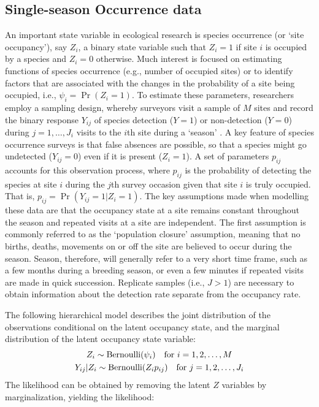 \documentclass[article,shortnames]{jss}
\DeclareMathOperator{\Bern}{Bernoulli}
\begin{document}
\subsection{
Single-season Occurrence data} 
\label{sec:occ}
 
An important state variable in ecological research is species occurrence 
(or `site occupancy'), say $Z_{i}$, a binary state variable such that 
$Z_{i}=1$ if site $i$ is occupied by a species and $Z_{i}=0$ otherwise.
Much interest is focused on estimating functions of species occurrence 
(e.g., number of occupied sites) or to identify factors that are
associated with the changes in the probability of a site being
occupied, i.e., $\psi_{i}  = \Pr(Z_{i}=1)$. To estimate these parameters, 
researchers employ a sampling design, whereby surveyors visit a sample of $M$
sites and record the binary response $Y_{ij}$ of species detection ($Y=1$) or
non-detection ($Y=0$) during $j=1,\ldots,J_{i}$ visits to the $i$th site 
during a `season' \citep{MacKenzie2002}.  
A key feature of species occurrence surveys is that false absences are 
possible, so that a species might go undetected ($Y_{ij} =0$) even if it is 
present ($Z_{i} = 1$). A set of parameters $p_{ij}$ accounts for this 
observation process, where $p_{ij}$ is the
probability of detecting the species at site $i$ during the $j$th
survey occasion given that site $i$ is truly occupied.  That is, 
$p_{ij} = \Pr(Y_{ij} = 1|Z_{i} = 1)$.
The key assumptions made
when modelling these data are that the occupancy state at a site 
remains constant throughout the season and repeated visits at
a site are independent.  The first assumption is commonly referred to as the
`population closure' assumption, meaning that no births, deaths, movements 
on or off the site are believed to occur during the season.  
Season, therefore, will generally refer to a very short time frame, such as 
a few months during a breeding season, or even a few minutes if repeated 
visits are made in quick succession.  Replicate samples (i.e., $J>1$) are 
necessary to obtain information about the detection rate separate from 
the occupancy rate.  

The following hierarchical model describes the joint distribution of the 
observations conditional on the latent occupancy state, and the marginal 
distribution of the latent occupancy state variable:
\begin{gather}
Z_i \sim \Bern(\psi_i) \text{\quad for $i=1,2,\dots,M$} \\
Y_{ij}|Z_i \sim \Bern(Z_i p_{ij})\text{\quad for $j=1,2,\dots,J_{i}$}
\end{gather}
The likelihood can be obtained by removing the latent $Z$ variables by 
marginalization, yielding the likelihood:
\end{document}
